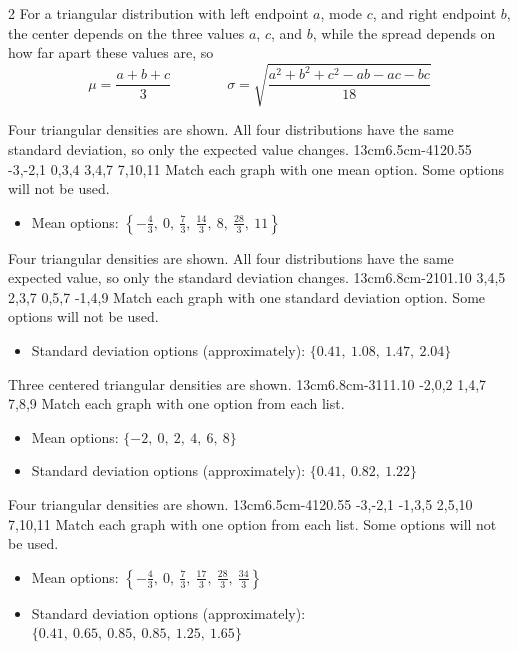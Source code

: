 \begin{multicols}{2}
\vspace{-0.25cm}
For a triangular distribution with left endpoint $a$, mode $c$, and right endpoint $b$, the center depends on the three values $a$, $c$, and $b$, while the spread depends on how far apart these values are, so
\[
\mu=\frac{a+b+c}{3}
\qquad \qquad
\sigma=\sqrt{\frac{a^2+b^2+c^2-ab-ac-bc}{18}}
\]

\vspace{-0.25cm}
Four triangular densities are shown. All four distributions have the same standard deviation, so only the expected value changes.
\TriangularFourGraph
{13cm}{6.5cm}{-4}{12}{0.55}
{-3,-2,1}
{0,3,4}
{3,4,7}
{7,10,11}
Match each graph with one mean option. Some options will not be used.
\begin{itemize}
\item Mean options: $\left\{-\frac{4}{3},\ 0,\ \frac{7}{3},\ \frac{14}{3},\ 8,\ \frac{28}{3},\ 11\right\}$
\end{itemize}

\vspace{-0.25cm}
Four triangular densities are shown. All four distributions have the same expected value, so only the standard deviation changes.
\TriangularFourGraph
{13cm}{6.8cm}{-2}{10}{1.10}
{3,4,5}
{2,3,7}
{0,5,7}
{-1,4,9}
Match each graph with one standard deviation option. Some options will not be used.
\begin{itemize}
\item Standard deviation options (approximately): $\{0.41,\ 1.08,\ 1.47,\ 2.04\}$
\end{itemize}

\vspace{-0.25cm}
Three centered triangular densities are shown.
\TriangularThreeGraph
{13cm}{6.8cm}{-3}{11}{1.10}
{-2,0,2}
{1,4,7}
{7,8,9}
Match each graph with one option from each list.
\begin{itemize}
\item Mean options: $\{-2, \ 0,\ 2,\ 4,\ 6 ,\ 8\}$
\item Standard deviation options (approximately): $\{0.41,\ 0.82,\ 1.22\}$
\end{itemize}

\vspace{-0.25cm}
Four triangular densities are shown.
\TriangularFourGraph
{13cm}{6.5cm}{-4}{12}{0.55}
{-3,-2,1}
{-1,3,5}
{2,5,10}
{7,10,11}
Match each graph with one option from each list. Some options will not be used.
\begin{itemize}
\item Mean options: $\left\{-\frac{4}{3},\ 0,\ \frac{7}{3},\ \frac{17}{3},\ \frac{28}{3},\ \frac{34}{3} \right\}$
\item Standard deviation options (approximately): $\{0.41,\ 0.65,\ 0.85,\ 0.85,\ 1.25,\ 1.65\}$
\end{itemize}


\end{multicols}
